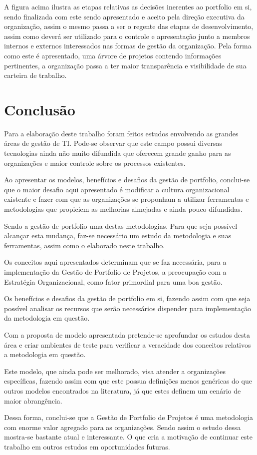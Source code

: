 \documentclass[12pt,a4paper,ruledheader,tocpage=prefix,floatnumber=continuous,pagestart=folhaderosto,font=times]{abnt}
\begin{document}
A figura acima ilustra as etapas relativas as decisões inerentes ao portfolio em si, sendo finalizada com este sendo apresentado e aceito pela direção 
executiva da organização, assim o mesmo passa a ser o regente das etapas de desenvolvimento, assim como deverá ser utilizado para o controle e 
apresentação junto a membros internos e externos interessados nas formas de gestão da organização. Pela forma como este é apresentado, uma árvore de 
projetos contendo informações pertinentes, a organização passa a ter maior transparência e visibilidade de sua carteira de trabalho.

\chapter{Conclusão}
Para a elaboração deste trabalho foram feitos estudos envolvendo as grandes áreas de gestão de TI. Pode-se observar que este campo possui diversas tecnologias
ainda não muito difundida que oferecem grande ganho para as organizações e maior controle sobre os processos existentes.

Ao apresentar os modelos, benefícios e desafios da gestão de portfolio, conclui-se que o maior desafio aqui apresentado é modificar a cultura organizacional 
existente e fazer com  que as organizações se proponham a utilizar ferramentas e metodologias que propiciem as melhorias almejadas e ainda pouco difundidas.

Sendo a gestão de portfolio uma destas metodologias. Para que seja possível alcançar esta mudança, faz-se necessário um estudo da metodologia e suas 
ferramentas, assim como o elaborado neste trabalho.

Os conceitos aqui apresentados determinam que se faz necessária, para a implementação da Gestão de Portfolio de Projetos, a preocupação com a Estratégia 
Organizacional, como fator primordial para uma boa gestão. 

Os benefícios e desafios da gestão de portfolio em si, fazendo assim com que seja possível analisar os recursos que serão necessários dispender para 
implementação da metodologia em questão.

Com a proposta de modelo apresentada pretende-se aprofundar os estudos desta área e criar ambientes de teste para verificar a veracidade dos conceitos 
relativos a metodologia em questão. 

Este modelo, que ainda pode ser melhorado, visa atender a organizações específicas, fazendo assim com que este possua definições menos genéricas do que 
outros modelos encontrados na literatura, já que estes definem um cenário de maior abrangência.

Dessa forma, conclui-se que a Gestão de Portfolio de Projetos é uma metodologia com enorme valor agregado para as organizações. Sendo assim o estudo dessa
mostra-se bastante atual e interessante. O que cria a motivação de continuar este trabalho em outros estudos em oportunidades futuras.


 
\end{document}
